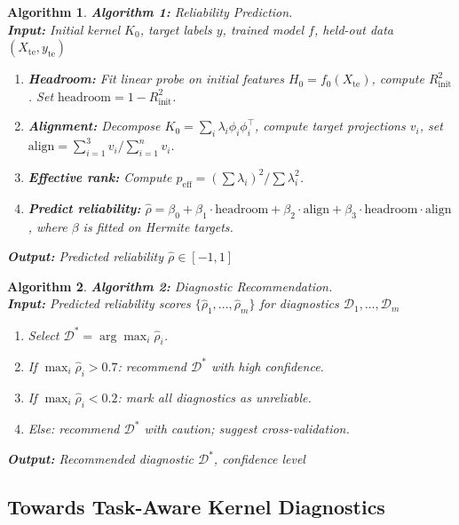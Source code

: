 \documentclass[twoside,11pt]{article}
\newtheorem{algorithm}{Algorithm}
\begin{document}
\begin{algorithm}
\label{alg:reliability}
\small
\textbf{Algorithm 1:} Reliability Prediction. \\
\textbf{Input:} Initial kernel $K_0$, target labels $y$, trained model $f$, held-out data $(X_{\text{te}}, y_{\text{te}})$

\begin{enumerate}
    \item \textbf{Headroom:} Fit linear probe on initial features $H_0 = f_0(X_{\text{te}})$, compute $R^2_{\text{init}}$. Set $\text{headroom} = 1 - R^2_{\text{init}}$.
    \item \textbf{Alignment:} Decompose $K_0 = \sum_i \lambda_i \phi_i \phi_i^\top$, compute target projections $v_i$, set $\text{align} = \sum_{i=1}^3 v_i / \sum_{i=1}^n v_i$.
    \item \textbf{Effective rank:} Compute $p_{\text{eff}} = (\sum \lambda_i)^2 / \sum \lambda_i^2$.
    \item \textbf{Predict reliability:} $\hat{\rho} = \beta_0 + \beta_1 \cdot \text{headroom} + \beta_2 \cdot \text{align} + \beta_3 \cdot \text{headroom} \cdot \text{align}$, where $\beta$ is fitted on Hermite targets.
\end{enumerate}
\textbf{Output:} Predicted reliability $\hat{\rho} \in [-1, 1]$
\end{algorithm}

\begin{algorithm}
\label{alg:recommend}
\small
\textbf{Algorithm 2:} Diagnostic Recommendation. \\
\small
\textbf{Input:} Predicted reliability scores $\{\hat{\rho}_1, \dots, \hat{\rho}_m\}$ for diagnostics $\mathcal{D}_1, \dots, \mathcal{D}_m$

\begin{enumerate}
    \item Select $\mathcal{D}^* = \arg\max_i \hat{\rho}_i$.
    \item If $\max_i \hat{\rho}_i > 0.7$: recommend $\mathcal{D}^*$ with high confidence.
    \item If $\max_i \hat{\rho}_i < 0.2$: mark all diagnostics as unreliable.
    \item Else: recommend $\mathcal{D}^*$ with caution; suggest cross-validation.
\end{enumerate}
\textbf{Output:} Recommended diagnostic $\mathcal{D}^*$, confidence level
\end{algorithm}

\subsection{Towards Task-Aware Kernel Diagnostics}
\end{document}
